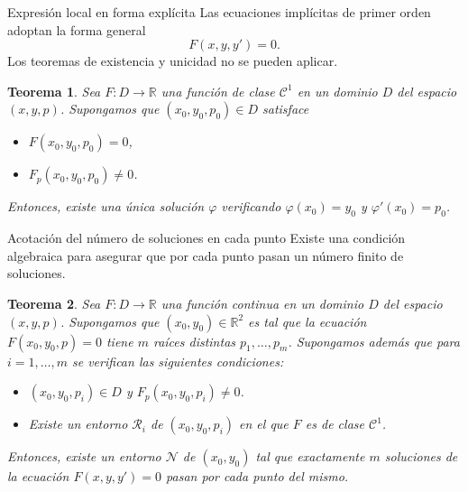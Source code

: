 \documentclass[10pt, spanish]{beamer}
\newtheorem{teorema}{Teorema}
\begin{document}
\begin{frame}{Expresión local en forma explícita}
  Las ecuaciones implícitas de primer orden adoptan la forma general
  \[
  F(x,y,y')=0.
  \]
  Los teoremas de existencia y unicidad no se pueden aplicar.
  \begin{teorema}
    Sea $F:D \to \mathbb{R}$ una función de clase $\mathcal C^1$ en un dominio $D$ del espacio $(x,y,p)$. Supongamos que $(x_0,y_0,p_0)\in D$ satisface
    \begin{itemize}
      \item $F(x_0,y_0,p_0)=0$,
      \item $F_p(x_0,y_0,p_0)\neq 0$.
    \end{itemize}
    Entonces, existe una única solución $\varphi$ verificando $\varphi(x_0)=y_0$ y $\varphi'(x_0)=p_0$.
  \end{teorema}
\end{frame}

\begin{frame}{Acotación del número de soluciones en cada punto}
  Existe una condición algebraica para asegurar que por cada punto pasan un número finito de soluciones.

  \begin{teorema}
    Sea $F:D\to \mathbb{R}$ una función continua en un dominio $D$ del espacio $(x,y,p)$. Supongamos que $(x_0,y_0)\in \mathbb{R}^2$ es tal que la ecuación $F(x_0, y_0,p)=0$ tiene $m$ raíces distintas $p_1,\dots,p_m$. Supongamos además que para $i=1,\dots, m$ se verifican las siguientes condiciones:
    \vspace{-1.5em}
    \begin{itemize}
      \item $(x_0,y_0,p_i)\in D$ y $F_p(x_0,y_0,p_i)\neq 0$.
      \item Existe un entorno $\mathcal R_i$ de $(x_0,y_0,p_i)$ en el que $F$ es de clase $\mathcal C^1$.
    \end{itemize}
    Entonces, existe un entorno $\mathcal N$ de $(x_0,y_0)$ tal que exactamente $m$ soluciones de la ecuación $F(x,y,y')=0$ pasan por cada punto del mismo.
  \end{teorema}
\end{frame}
\end{document}
